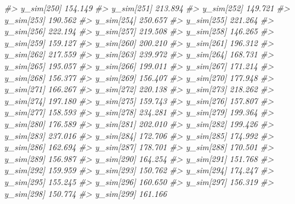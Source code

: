 \documentclass[
  10pt,
  italian,
  a4paper,
  extrafontsizes,onecolumn,openright
  ]{memoir}
\newenvironment{Shaded}{\begin{snugshade}}{\end{snugshade}}
\newcommand{\CommentTok}[1]{\textcolor[rgb]{0.56,0.35,0.01}{\textit{#1}}}
\begin{document}
\begin{Shaded}
\begin{Highlighting}[]
\CommentTok{\#\textgreater{}   y\_sim[250] 154.149}
\CommentTok{\#\textgreater{}   y\_sim[251] 213.894}
\CommentTok{\#\textgreater{}   y\_sim[252] 149.721}
\CommentTok{\#\textgreater{}   y\_sim[253] 190.562}
\CommentTok{\#\textgreater{}   y\_sim[254] 250.657}
\CommentTok{\#\textgreater{}   y\_sim[255] 221.264}
\CommentTok{\#\textgreater{}   y\_sim[256] 222.194}
\CommentTok{\#\textgreater{}   y\_sim[257] 219.508}
\CommentTok{\#\textgreater{}   y\_sim[258] 146.265}
\CommentTok{\#\textgreater{}   y\_sim[259] 159.127}
\CommentTok{\#\textgreater{}   y\_sim[260] 200.210}
\CommentTok{\#\textgreater{}   y\_sim[261] 196.312}
\CommentTok{\#\textgreater{}   y\_sim[262] 217.559}
\CommentTok{\#\textgreater{}   y\_sim[263] 239.972}
\CommentTok{\#\textgreater{}   y\_sim[264] 168.731}
\CommentTok{\#\textgreater{}   y\_sim[265] 195.057}
\CommentTok{\#\textgreater{}   y\_sim[266] 199.011}
\CommentTok{\#\textgreater{}   y\_sim[267] 171.214}
\CommentTok{\#\textgreater{}   y\_sim[268] 156.377}
\CommentTok{\#\textgreater{}   y\_sim[269] 156.407}
\CommentTok{\#\textgreater{}   y\_sim[270] 177.948}
\CommentTok{\#\textgreater{}   y\_sim[271] 166.267}
\CommentTok{\#\textgreater{}   y\_sim[272] 220.138}
\CommentTok{\#\textgreater{}   y\_sim[273] 218.262}
\CommentTok{\#\textgreater{}   y\_sim[274] 197.180}
\CommentTok{\#\textgreater{}   y\_sim[275] 159.743}
\CommentTok{\#\textgreater{}   y\_sim[276] 157.807}
\CommentTok{\#\textgreater{}   y\_sim[277] 158.593}
\CommentTok{\#\textgreater{}   y\_sim[278] 234.281}
\CommentTok{\#\textgreater{}   y\_sim[279] 199.364}
\CommentTok{\#\textgreater{}   y\_sim[280] 176.589}
\CommentTok{\#\textgreater{}   y\_sim[281] 202.010}
\CommentTok{\#\textgreater{}   y\_sim[282] 199.426}
\CommentTok{\#\textgreater{}   y\_sim[283] 237.016}
\CommentTok{\#\textgreater{}   y\_sim[284] 172.706}
\CommentTok{\#\textgreater{}   y\_sim[285] 174.992}
\CommentTok{\#\textgreater{}   y\_sim[286] 162.694}
\CommentTok{\#\textgreater{}   y\_sim[287] 178.701}
\CommentTok{\#\textgreater{}   y\_sim[288] 170.501}
\CommentTok{\#\textgreater{}   y\_sim[289] 156.987}
\CommentTok{\#\textgreater{}   y\_sim[290] 164.254}
\CommentTok{\#\textgreater{}   y\_sim[291] 151.768}
\CommentTok{\#\textgreater{}   y\_sim[292] 159.959}
\CommentTok{\#\textgreater{}   y\_sim[293] 150.762}
\CommentTok{\#\textgreater{}   y\_sim[294] 174.247}
\CommentTok{\#\textgreater{}   y\_sim[295] 155.245}
\CommentTok{\#\textgreater{}   y\_sim[296] 160.650}
\CommentTok{\#\textgreater{}   y\_sim[297] 156.319}
\CommentTok{\#\textgreater{}   y\_sim[298] 150.774}
\CommentTok{\#\textgreater{}   y\_sim[299] 161.166}

\end{Highlighting}
\end{Shaded}
\end{document}
